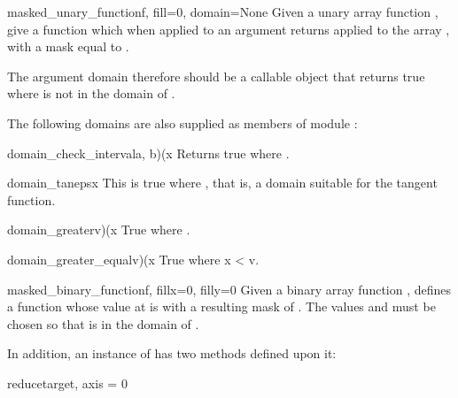 \begin{classdesc}{masked_unary_function}{f, fill=0, domain=None}
   Given a unary array function , give a function
   which when applied to an argument  returns  applied to
   the array , with a mask equal to
   .
   
   The argument domain therefore should be a callable object that returns true
   where  is not in the domain of . 
\end{classdesc}

The following domains are also supplied as members of module :
\begin{classdesc}{domain_check_interval}{a, b)(x}
   Returns true where .
\end{classdesc}

\begin{classdesc}{domain_tan}{eps}{x}
   This is true where , that is, a domain suitable for
   the tangent function.
\end{classdesc}

\begin{classdesc}{domain_greater}{v)(x}
   True where .
\end{classdesc}

\begin{classdesc}{domain_greater_equal}{v)(x}
   True where x < v.
\end{classdesc}


\begin{classdesc}{masked_binary_function}{f, fillx=0, filly=0}
   Given a binary array function ,  defines a function whose value at  is
    with a resulting mask of
   . The values  and
    must be chosen so that  is in the domain of
   .
\end{classdesc}

In addition, an instance of
has two methods defined upon it:

\begin{methoddesc}{reduce}{target, axis = 0}
\end{methoddesc}

